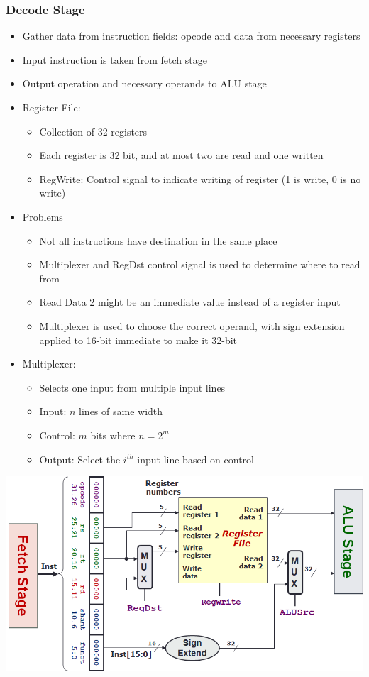 \documentclass[10pt, portrait]{article}
\begin{document}
\begin{multicols*}{2}
\subsubsection{Decode Stage}
\begin{itemize}
    \item Gather data from instruction fields: opcode and data from necessary registers
    \item Input instruction is taken from fetch stage
    \item Output operation and necessary operands to ALU stage
    \item Register File: \begin{itemize}
        \item Collection of 32 registers
        \item Each register is 32 bit, and at most two are read and one written
        \item RegWrite: Control signal to indicate writing of register (1 is write, 0 is no write)
    \end{itemize}
    \item Problems
    \begin{itemize}
        \item Not all instructions have destination in the same place
        \item Multiplexer and RegDst control signal is used to determine where to read from
        \item Read Data 2 might be an immediate value instead of a register input
        \item Multiplexer is used to choose the correct operand, with sign extension applied to 16-bit immediate to make it 32-bit
    \end{itemize}
    \item Multiplexer:
    \begin{itemize}
        \item Selects one input from multiple input lines
        \item Input: $n$ lines of same width
        \item Control: $m$ bits where $n=2^m$
        \item Output: Select the $i^{th}$ input line based on control
    \end{itemize}
\end{itemize}
\begin{center}
    \includegraphics[width=0.7\linewidth]{decode.png}
\end{center}


\end{multicols*}
\end{document}
